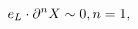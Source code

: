 \begin{equation}
e_{L}\cdot \partial ^{n}X\sim 0,n=1,\text{\ \ \ \ \ \ \ \ \ \ \ \ \ \ \ \ \
\ \ \ \ \ \ \ \ \ \ \ \ }
\end{equation}%
